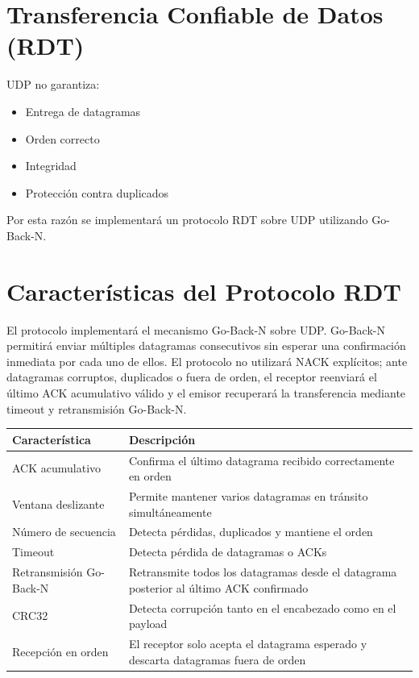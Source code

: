 \documentclass[12pt]{article}
\begin{document}
\section{Transferencia Confiable de Datos (RDT)}

UDP no garantiza:

\begin{itemize}
\item Entrega de datagramas
\item Orden correcto
\item Integridad
\item Protección contra duplicados
\end{itemize}

Por esta razón se implementará un protocolo RDT sobre UDP utilizando Go-Back-N.

\section{Características del Protocolo RDT}

El protocolo implementará el mecanismo Go-Back-N sobre UDP.
Go-Back-N permitirá enviar múltiples datagramas consecutivos sin esperar una confirmación inmediata por cada uno de ellos.
El protocolo no utilizará NACK explícitos; ante datagramas corruptos, duplicados o fuera de orden, el receptor reenviará el último ACK acumulativo válido y el emisor recuperará la transferencia mediante timeout y retransmisión Go-Back-N.

\begin{table}[h]
\centering
\begin{tabular}{|l|p{9cm}|}
\hline
Característica & Descripción \\
\hline
ACK acumulativo & Confirma el último datagrama recibido correctamente en orden \\
\hline
Ventana deslizante & Permite mantener varios datagramas en tránsito simultáneamente \\
\hline
Número de secuencia & Detecta pérdidas, duplicados y mantiene el orden \\
\hline
Timeout & Detecta pérdida de datagramas o ACKs \\
\hline
Retransmisión Go-Back-N & Retransmite todos los datagramas desde el datagrama posterior al último ACK confirmado \\
\hline
CRC32 & Detecta corrupción tanto en el encabezado como en el payload \\
\hline
Recepción en orden & El receptor solo acepta el datagrama esperado y descarta datagramas fuera de orden \\
\hline
\end{tabular}
\end{table}
\end{document}
